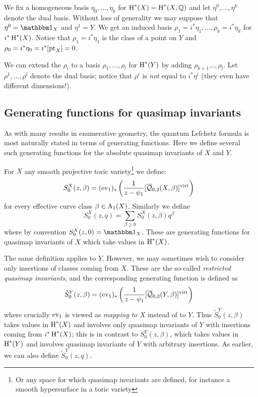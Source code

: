We fix a homogeneous basis $\eta_0, \ldots, \eta_k$ for $\operatorname{H}^*(X) = \operatorname{H}^*(X,\mathbb{Q})$ and let $\eta^0, \ldots, \eta^k$ denote the dual basis. Without loss of generality we may suppose that $\eta^0=\mathbbm 1_X$ and $\eta^1=Y$. We get an induced basis $\rho_1=i^*\eta_1, \ldots, \rho_k = i^* \eta_k$ for $i^*\operatorname{H}^*(X)$. Notice that $\rho_1 = i^* \eta_1$ is the class of a point on $Y$ and $\rho_0 = i^* \eta_0 = i^* [\operatorname{pt}_X] = 0$.

We can extend the $\rho_i$ to a basis $\rho_1, \ldots, \rho_l$ for $\operatorname{H}^*(Y)$ by adding $\rho_{k+1}\ldots,\rho_{l}$. Let $\rho^1, \ldots, \rho^l$ denote the dual basis; notice that $\rho^i$ is \emph{not} equal to $i^* \eta^i$ (they even have different dimensions!).

\subsection{Generating functions for quasimap invariants}
As with many results in enumerative geometry, the quantum Lefchetz formula is most naturally stated in terms of generating functions. Here we define several such generating functions for the absolute quasimap invariants of $X$ and $Y$.

For $X$ any smooth projective toric variety\footnote{Or any space for which quasimap invariants are defined, for instance a smooth hypersurface in a toric variety} we define: 
\begin{equation*} S_0^X(z,\beta)=(\operatorname{ev}_1)_*\left(\frac{1}{z-\psi_1} [\overline{\mathcal Q}_{0,2}(X,\beta)]^{\operatorname{virt}}\right) \end{equation*}
for every effective curve class $\beta\in \operatorname{A}_1(X)$. Similarly we define
\begin{equation*} S_0^X(z,q)=\sum_{\beta\geq 0}S_0^X(z,\beta) q^\beta \end{equation*}
where by convention $S_0^X(z,0)= \mathbbm 1_X$. These are generating functions for quasimap invariants of $X$ which take values in $\operatorname{H}^*(X)$.

The same definition applies to $Y$. However, we may sometimes wish to consider only insertions of classes coming from $X$. These are the so-called \emph{restricted quasimap invariants}, and the corresponding generating function is defined as
\begin{equation*} \tilde{S}^Y_0(z,\beta) = (\operatorname{ev}_1)_* \left( \dfrac{1}{z-\psi_1} [\overline{\mathcal Q}_{0,2}(Y,\beta)]^{\operatorname{virt}} \right) \end{equation*}
where crucially $\operatorname{ev}_1$ is viewed as \emph{mapping to $X$} instead of to $Y$. Thus $\tilde{S}^Y_0(z,\beta)$ takes values in $\operatorname{H}^*(X)$ and involves only quasimap invariants of $Y$ with insertions coming from $i^*\operatorname{H}^*(X)$; this is in contrast to $S^Y_0(z,\beta)$, which takes values in $\operatorname{H}^*(Y)$ and involves quasimap invariants of $Y$ with arbitrary insertions. As earlier, we can also define $\tilde{S}_0^Y(z,q)$.


